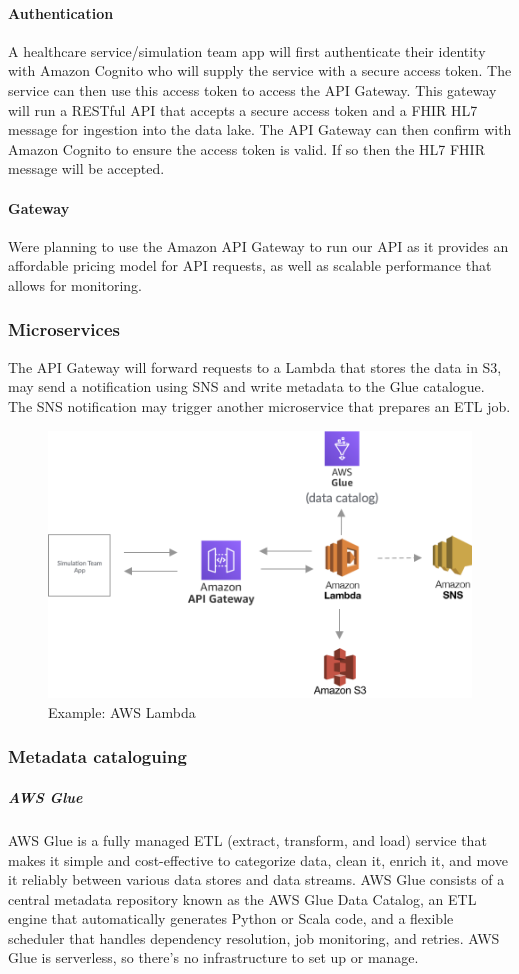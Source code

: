 \documentclass[10pt]{article}
\begin{document}
\paragraph{Authentication}
A healthcare service/simulation team app will first authenticate their identity with Amazon Cognito who will supply the service with a secure access token. The service can then use this access token to access the API Gateway. This gateway will run a RESTful API that accepts a secure access token and a FHIR HL7 message for ingestion into the data lake. The API Gateway can then confirm with Amazon Cognito to ensure the access token is valid. If so then the HL7 FHIR message will be accepted.
\paragraph{Gateway}
Were planning to use the Amazon API Gateway to run our API as it provides an affordable pricing model for API requests, as well as scalable performance that allows for monitoring.

\subsubsection{Microservices}
The API Gateway will forward requests to a Lambda that stores the data in S3, may send a notification using SNS and write metadata to the Glue catalogue. The SNS notification may trigger another microservice that prepares an ETL job.
\begin{figure}[h!]
	\centering
	\includegraphics[width=0.8\linewidth]{images/Lambda.png}
	\caption*{Example: AWS Lambda}	
\end{figure}

\newpage
\subsubsection{Metadata cataloguing}
\subparagraph{AWS Glue}
AWS Glue \cite{aws-glue} is a fully managed ETL (extract, transform, and load) service that makes it simple and cost-effective to categorize data, clean it, enrich it, and move it reliably between various data stores and data streams. AWS Glue consists of a central metadata repository known as the AWS Glue Data Catalog, an ETL engine that automatically generates Python or Scala code, and a flexible scheduler that handles dependency resolution, job monitoring, and retries. AWS Glue is serverless, so there’s no infrastructure to set up or manage.
\end{document}
